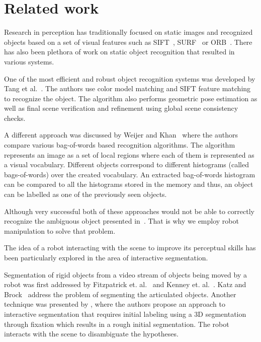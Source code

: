 \section{Related work}



    Research in perception has traditionally focused on  static images and recognized objects based on a set of visual features such as SIFT~\cite{lowe2004distinctive}, SURF~\cite{bay2006surf} or ORB~\cite{rublee2011orb}.
    There has also been plethora of work on static object recognition that resulted in various systems.

    One of the most efficient and robust object recognition systems was developed by Tang et al.~\cite{tang2012textured}. The authors use color model matching and SIFT feature matching to recognize the object. The algorithm also performs geometric pose estimation as well as final scene verification and refinement using global scene consistency checks. 

    A different approach was discussed by Weijer and Khan~\cite{van2013fusing} where the authors compare various bag-of-words based recognition algorithms. The algorithm represents an image as a set of local regions where each of them is represented as a visual vocabulary. Different objects correspond to different histograms (called bags-of-words) over the created vocabulary. An extracted bag-of-words histogram can be compared to all the histograms stored in the memory and thus, an object can be labelled as one of the previously seen objects.

    Although very successful both of these approaches would not be able to correctly recognize the ambiguous object presented in~. That is why we employ robot manipulation to solve that problem.

    The idea of a robot interacting with the scene to improve its perceptual skills has been particularly explored in the area of interactive segmentation.

    Segmentation of rigid objects from a video stream of objects being moved by a robot was first addressed by Fitzpatrick et. al.~\cite{fitzpatrick_active_vision} and Kenney et. al.~\cite{KenneyInteractive}. Katz and Brock~\cite{Katz-WS-MM-ICRA2011} address the problem of segmenting the articulated objects. Another technique was presented by \cite{bergstrom11icvs}, where the authors propose an approach to interactive segmentation that requires initial labeling using  a 3D segmentation through fixation which results in a rough initial segmentation. The robot interacts with the scene to disambiguate the hypotheses.

